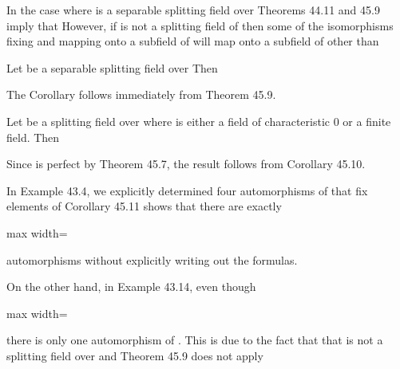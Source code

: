 \documentclass[11pt,oneside]{article}
\begin{document}
\begin{BookBody}
In the case where  is a separable splitting field over  Theorems 44.11 and 45.9 imply that  However, if  is not a splitting field of  then some of the isomorphisms fixing  and mapping  onto a subfield of  will map onto a subfield of  other than 

 Let  be a separable splitting field over  Then 

 The Corollary follows immediately from Theorem 45.9. \BookEnd{\blacklozenge}

 Let  be a splitting field over  where  is either a field of characteristic 0 or a finite field. Then 

 Since  is perfect by Theorem 45.7, the result follows from Corollary 45.10. \BookEnd{\blacklozenge}

 In Example 43.4, we explicitly determined four automorphisms of  that fix elements of  Corollary 45.11 shows that there are exactly

\begin{center}\begin{adjustbox}{max width=\linewidth}\end{adjustbox}\end{center}

\noindent automorphisms without explicitly writing out the formulas.

On the other hand, in Example 43.14, even though

\begin{center}\begin{adjustbox}{max width=\linewidth}\end{adjustbox}\end{center}

there is only one automorphism of . This is due to the fact that that  is not a splitting field over  and Theorem 45.9 does not apply\BookEnd{\blacktriangle}


\end{BookBody}
\end{document}
